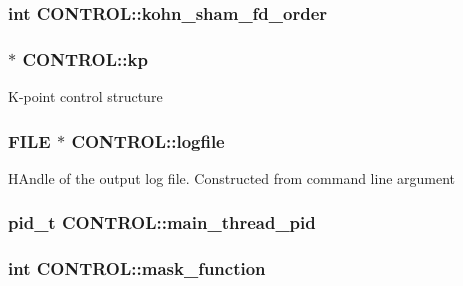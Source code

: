 \hypertarget{struct_c_o_n_t_r_o_l_a55724097020f20e54c4175619a801bc8}{
\subsubsection[{kohn\-\_\-sham\-\_\-fd\-\_\-order}]{\setlength{\rightskip}{0pt plus 5cm}int C\-O\-N\-T\-R\-O\-L\-::kohn\-\_\-sham\-\_\-fd\-\_\-order}}\label{struct_c_o_n_t_r_o_l_a55724097020f20e54c4175619a801bc8}
\hypertarget{struct_c_o_n_t_r_o_l_a01e8b32300c15ac26cb560420455f2bd}{
\subsubsection[{kp}]{ $\ast$ C\-O\-N\-T\-R\-O\-L\-::kp}}\label{struct_c_o_n_t_r_o_l_a01e8b32300c15ac26cb560420455f2bd}
K-\/point control structure \hypertarget{struct_c_o_n_t_r_o_l_a743c05f31c25b3ee10c2f9ea5ae1f0a5}{
\subsubsection[{logfile}]{\setlength{\rightskip}{0pt plus 5cm}F\-I\-L\-E $\ast$ C\-O\-N\-T\-R\-O\-L\-::logfile}}\label{struct_c_o_n_t_r_o_l_a743c05f31c25b3ee10c2f9ea5ae1f0a5}
H\-Andle of the output log file. Constructed from command line argument \hypertarget{struct_c_o_n_t_r_o_l_aa486f719299ef63193ff1098c210bdcf}{
\subsubsection[{main\-\_\-thread\-\_\-pid}]{\setlength{\rightskip}{0pt plus 5cm}pid\-\_\-t C\-O\-N\-T\-R\-O\-L\-::main\-\_\-thread\-\_\-pid}}\label{struct_c_o_n_t_r_o_l_aa486f719299ef63193ff1098c210bdcf}
\hypertarget{struct_c_o_n_t_r_o_l_a4486e8ad9ffd03004ecdf186950946c2}{
\subsubsection[{mask\-\_\-function}]{\setlength{\rightskip}{0pt plus 5cm}int C\-O\-N\-T\-R\-O\-L\-::mask\-\_\-function}}\label{struct_c_o_n_t_r_o_l_a4486e8ad9ffd03004ecdf186950946c2}
